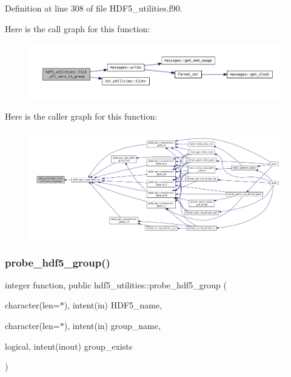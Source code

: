 Definition at line 308 of file H\+D\+F5\+\_\+utilities.\+f90.

Here is the call graph for this function\+:
\nopagebreak
\begin{figure}[H]
\begin{center}
\leavevmode
\includegraphics[width=350pt]{namespacehdf5__utilities_aa9d76166f970a7052cd0d96c8f3ee0be_cgraph}
\end{center}
\end{figure}
Here is the caller graph for this function\+:
\nopagebreak
\begin{figure}[H]
\begin{center}
\leavevmode
\includegraphics[width=350pt]{namespacehdf5__utilities_aa9d76166f970a7052cd0d96c8f3ee0be_icgraph}
\end{center}
\end{figure}
\mbox{\label{namespacehdf5__utilities_ae4e6c96512460a0ede8dc5b1a43681e8}} 
\subsubsection{\texorpdfstring{probe\+\_\+hdf5\+\_\+group()}{probe\_hdf5\_group()}}
{\footnotesize\ttfamily integer function, public hdf5\+\_\+utilities\+::probe\+\_\+hdf5\+\_\+group (\begin{DoxyParamCaption}\item[{character(len=$\ast$), intent(in)}]{H\+D\+F5\+\_\+name,  }\item[{character(len=$\ast$), intent(in)}]{group\+\_\+name,  }\item[{logical, intent(inout)}]{group\+\_\+exists }\end{DoxyParamCaption})}



